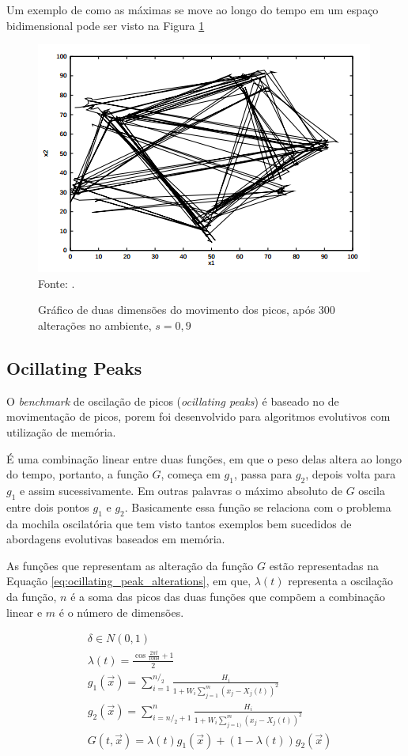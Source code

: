 Um exemplo de como as máximas se move ao longo do tempo em um espaço bidimensional pode ser visto na Figura \ref{fig:moving_peaks}

\begin{figure}[!htb]
	\caption{Gráfico de duas dimensões do movimento dos picos, após 300 alterações no ambiente, $ s = 0,9 $}
	\centering
	\includegraphics[scale=0.5]{images/moving_peak.png}
	\label{fig:moving_peaks}{\\Fonte: .}
\end{figure}

\subsection{Ocillating Peaks}

O \textit{benchmark} de oscilação de picos (\textit{ocillating peaks}) é baseado no de movimentação de picos, porem foi desenvolvido para algoritmos evolutivos com utilização de memória.

É uma combinação linear entre duas funções, em que o peso delas altera ao longo do tempo, portanto, a função $G$, começa em $g_1$, passa para $g_2$, depois volta para $g_1$ e assim sucessivamente. Em outras palavras o máximo absoluto de $G$ oscila entre dois pontos $g_1$ e $g_2$. Basicamente essa função se relaciona com o problema da mochila oscilatória que tem visto tantos exemplos bem sucedidos de abordagens evolutivas baseados em memória.

As funções que representam as alteração da função $G$ estão representadas na Equação \ref{eq:ocillating_peak_alterations}, em que, $\lambda (t)$ representa a oscilação da função, $n$ é a soma das picos das duas funções que compõem a combinação linear e $m$ é o número de dimensões.

\begin{equation}
\label{eq:ocillating_peak_alterations}
\begin{split}
& \delta \in N(0,1) \\
& \lambda (t) = \frac{\cos{\frac{2\pi t}{100\delta}} +1}{2} \\
& g_1(\vec{x}) = \sum_{i=1}^{n/_2} \frac{H_i}{1+W_i \sum_{j=1}^{m} (x_j - X_j(t))^2} \\
& g_2(\vec{x}) = \sum_{i=n/_2+1}^{n} \frac{H_i}{1+W_i \sum_{j=1)}^{m} (x_j - X_j(t))^2} \\
& G(t,\vec{x}) = \lambda (t) g_1(\vec{x}) + (1-\lambda (t))g_2(\vec{x})
\end{split}
\end{equation}

